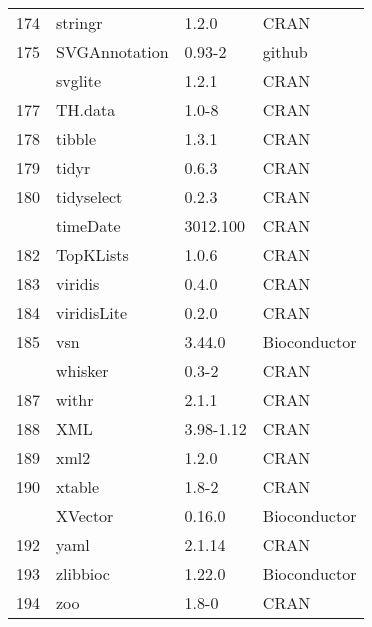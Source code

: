\begin{longtable}{rlll}
174 & stringr & 1.2.0 & CRAN\\
175 & SVGAnnotation & 0.93-2 & github\\
\addlinespace
176 & svglite & 1.2.1 & CRAN\\
177 & TH.data & 1.0-8 & CRAN\\
178 & tibble & 1.3.1 & CRAN\\
179 & tidyr & 0.6.3 & CRAN\\
180 & tidyselect & 0.2.3 & CRAN\\
\addlinespace
181 & timeDate & 3012.100 & CRAN\\
182 & TopKLists & 1.0.6 & CRAN\\
183 & viridis & 0.4.0 & CRAN\\
184 & viridisLite & 0.2.0 & CRAN\\
185 & vsn & 3.44.0 & Bioconductor\\
\addlinespace
186 & whisker & 0.3-2 & CRAN\\
187 & withr & 2.1.1 & CRAN\\
188 & XML & 3.98-1.12 & CRAN\\
189 & xml2 & 1.2.0 & CRAN\\
190 & xtable & 1.8-2 & CRAN\\
\addlinespace
191 & XVector & 0.16.0 & Bioconductor\\
192 & yaml & 2.1.14 & CRAN\\
193 & zlibbioc & 1.22.0 & Bioconductor\\
194 & zoo & 1.8-0 & CRAN\\
\bottomrule
\end{longtable}
